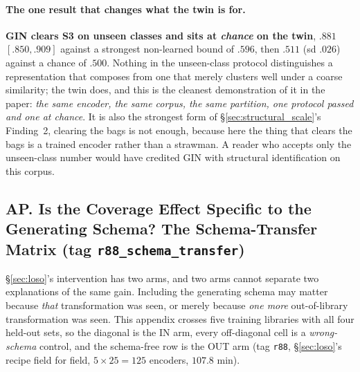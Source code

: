 \paragraph{The one result that changes what the twin is for.} \textbf{GIN clears S3 on unseen classes and sits at \emph{chance} on the twin}, $.881$ $[.850,.909]$ against a strongest non-learned bound of $.596$, then $.511$ (sd $.026$) against a chance of $.500$. Nothing in the unseen-class protocol distinguishes a representation that composes from one that merely clusters well under a coarse similarity; the twin does, and this is the cleanest demonstration of it in the paper: \emph{the same encoder, the same corpus, the same partition, one protocol passed and one at chance}. It is also the strongest form of \S\ref{sec:structural_scale}'s Finding~2, clearing the bags is not enough, because here the thing that clears the bags is a trained encoder rather than a strawman. A reader who accepts only the unseen-class number would have credited GIN with structural identification on this corpus.

\subsection*{AP. Is the Coverage Effect Specific to the Generating Schema? The Schema-Transfer Matrix (tag \texttt{r88\_schema\_transfer})}

\S\ref{sec:loso}'s intervention has two arms, and two arms cannot separate two explanations of the same gain. Including the generating schema may matter because \emph{that} transformation was seen, or merely because \emph{one more} out-of-library transformation was seen. This appendix crosses five training libraries with all four held-out sets, so the diagonal is the IN arm, every off-diagonal cell is a \emph{wrong-schema} control, and the schema-free row is the OUT arm (tag \texttt{r88}, \S\ref{sec:loso}'s recipe field for field, $5\times25 = 125$ encoders, $107.8$ min).

